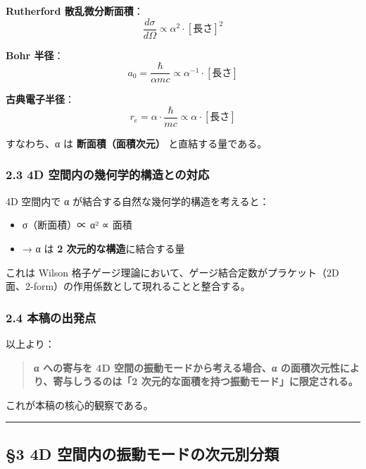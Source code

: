\documentclass[
  11pt]{ltjsarticle}
\providecommand{\tightlist}{%
  \setlength{\itemsep}{0pt}\setlength{\parskip}{0pt}}
\begin{document}
\textbf{Rutherford 散乱微分断面積}：
\[\frac{d\sigma}{d\Omega} \propto \alpha^2 \cdot [\text{長さ}]^2\]

\textbf{Bohr 半径}：
\[a_0 = \frac{\hbar}{\alpha mc} \propto \alpha^{-1} \cdot [\text{長さ}]\]

\textbf{古典電子半径}：
\[r_e = \alpha \cdot \frac{\hbar}{mc} \propto \alpha \cdot [\text{長さ}]\]

すなわち、α は \textbf{断面積（面積次元）} と直結する量である。

\subsubsection{2.3 4D
空間内の幾何学的構造との対応}\label{d-ux7a7aux9593ux5185ux306eux5e7eux4f55ux5b66ux7684ux69cbux9020ux3068ux306eux5bfeux5fdc}

4D 空間内で α が結合する自然な幾何学的構造を考えると：

\begin{itemize}
\tightlist
\item
  σ（断面積）∝ α² ∝ 面積
\item
  → α は \textbf{2 次元的な構造}に結合する量
\end{itemize}

これは Wilson 格子ゲージ理論において、ゲージ結合定数がプラケット（2D
面、2-form）の作用係数として現れることと整合する。

\subsubsection{2.4
本稿の出発点}\label{ux672cux7a3fux306eux51faux767aux70b9}

以上より：

\begin{quote}
\textbf{α への寄与を 4D 空間の振動モードから考える場合、α
の面積次元性により、寄与しうるのは「2
次元的な面積を持つ振動モード」に限定される。}
\end{quote}

これが本稿の核心的観察である。

\begin{center}\rule{0.5\linewidth}{0.5pt}\end{center}

\subsection{§3 4D
空間内の振動モードの次元別分類}\label{d-ux7a7aux9593ux5185ux306eux632fux52d5ux30e2ux30fcux30c9ux306eux6b21ux5143ux5225ux5206ux985e}
\end{document}
